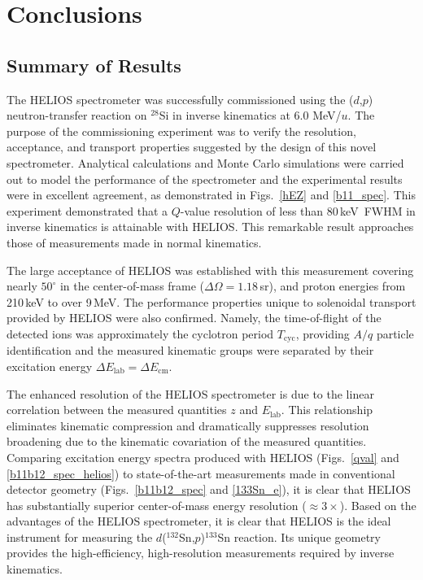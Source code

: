 \chapter{Conclusions}
\label{con}
\section{Summary of Results}
The HELIOS spectrometer was successfully commissioned using the ($d$,$p$) neu\-tron-\-trans\-fer reaction
on $^{28}$Si in inverse kinematics at 6.0 MeV/$u$.
The purpose of the commissioning experiment was to verify the resolution, acceptance, and transport properties suggested by the design of this novel spectrometer.   Analytical calculations and Monte Carlo simulations were carried out to model the performance of the spectrometer and the experimental results were in excellent agreement, as demonstrated in Figs.~\ref{hEZ} and \ref{b11_spec}.  This experiment demonstrated that a $Q$-value resolution of less than 80\,keV~FWHM in inverse kinematics is attainable with HELIOS.  This remarkable result approaches those of measurements made in normal kinematics.  

The large acceptance of HELIOS was established with this measurement covering nearly $50^\circ$ in the center-of-mass frame ($\Delta \Omega=1.18$\,sr), and proton energies from 210\,keV to over 9\,MeV.  The performance properties unique to solenoidal transport provided by HELIOS were also confirmed.  Namely, the time-of-flight of the detected ions was approximately the cyclotron period $T_\mathrm{cyc}$, providing $A/q$ particle identification and the measured kinematic groups were separated by their excitation energy $\Delta E_\mathrm{lab}=\Delta E_\mathrm{cm}$.  %

The enhanced resolution of the HELIOS spectrometer is due to the linear correlation between the measured quantities $z$ and $E_\mathrm{lab}$.  This relationship eliminates kinematic compression and dramatically suppresses resolution broadening due to the kinematic covariation of the measured quantities.  Comparing excitation energy spectra produced with HELIOS (Figs.~\ref{qval} and \ref{b11b12_spec_helios}) to state-of-the-art measurements made in conventional detector geometry (Figs.~\ref{b11b12_spec} and \ref{133Sn_e}), it is clear that HELIOS has substantially superior center-of-mass energy resolution ($\approx3\times$).  Based on the advantages of the HELIOS spectrometer, it is clear that HELIOS is the ideal instrument for measuring the $d$($^{132}$Sn,$p$)$^{133}$Sn reaction.  Its unique geometry provides the high-efficiency, high-resolution measurements required by inverse kinematics.  

